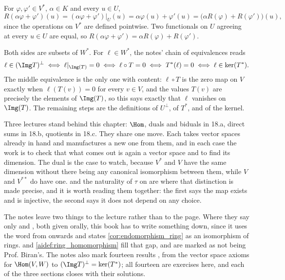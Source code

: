 \begin{exercisesolution}
\label{sol:restriction_linear}
For $\varphi, \varphi' \in V^*$, $\alpha \in K$ and every $u \in U$,
\[
R(\alpha \varphi + \varphi')(u) = (\alpha \varphi + \varphi')|_U(u) = \alpha \varphi(u) + \varphi'(u) = \big(\alpha R(\varphi) + R(\varphi')\big)(u),
\]
since the operations on $V^*$ are defined pointwise. Two functionals on $U$ agreeing at every $u \in U$ are equal, so $R(\alpha \varphi + \varphi') = \alpha R(\varphi) + R(\varphi')$.
\end{exercisesolution}

\begin{exercisesolution}
\label{sol:annihilator_image_kernel_dual}
Both sides are subsets of $W^*$. For $\ell \in W^*$, the notes' chain of equivalences reads
\[
\ell \in (\Img T)^\perp \iff \ell|_{\Img(T)} = 0 \iff \ell \circ T = 0 \iff T^*(\ell) = 0 \iff \ell \in \ker(T^*).
\]
The middle equivalence is the only one with content: $\ell \circ T$ is the zero map on $V$ exactly when $\ell(T(v)) = 0$ for every $v \in V$, and the values $T(v)$ are precisely the elements of $\Img(T)$, so this says exactly that $\ell$ vanishes on $\Img(T)$. The remaining steps are the definitions of $U^\perp$, of $T^*$, and of the kernel.
\end{exercisesolution}



\begin{ainote}
Three lectures stand behind this chapter: $\Hom$, duals and biduals in 18.a,
direct sums in 18.b, quotients in 18.c. They share one move. Each takes vector
spaces already in hand and manufactures a new one from them, and in each case
the work is to check that what comes out is again a vector space and to find its
dimension. The dual is the case to watch, because $V^*$ and $V$ have the same
dimension without there being any canonical isomorphism between them, while $V$
and $V^{**}$ do have one.  and the naturality of
$\tau$ on  are where that distinction is made
precise, and it is worth reading them together: the first says the map exists
and is injective, the second says it does not depend on any choice.

The notes leave two things to the lecture rather than to the page. Where they
say only  and , both given orally, this book has to write something
down, since it uses the word from  onwards and states
\cref{cor:endomorphism_ring} as an isomorphism of rings.  and
\cref{aidef:ring_homomorphism} fill that gap, and are marked as not being Prof.
Biran's. The notes also mark fourteen results , from the vector space
axioms for $\Hom(V,W)$ to $(\Img T)^\perp = \ker(T^*)$; all fourteen are
exercises here, and each of the three sections closes with their solutions.
\end{ainote}

